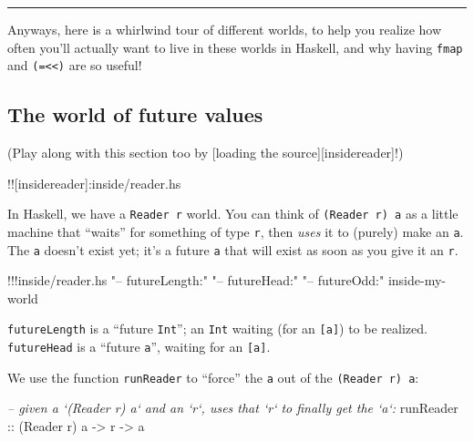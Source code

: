 \documentclass[]{article}
\newenvironment{Shaded}{}{}
\newcommand{\DataTypeTok}[1]{\textcolor[rgb]{0.56,0.13,0.00}{{#1}}}
\newcommand{\StringTok}[1]{\textcolor[rgb]{0.25,0.44,0.63}{{#1}}}
\newcommand{\CommentTok}[1]{\textcolor[rgb]{0.38,0.63,0.69}{\textit{{#1}}}}
\newcommand{\OtherTok}[1]{\textcolor[rgb]{0.00,0.44,0.13}{{#1}}}
\newcommand{\FunctionTok}[1]{\textcolor[rgb]{0.02,0.16,0.49}{{#1}}}
\newcommand{\NormalTok}[1]{{#1}}
\begin{document}
\begin{center}\rule{0.5\linewidth}{\linethickness}\end{center}

Anyways, here is a whirlwind tour of different worlds, to help you
realize how often you'll actually want to live in these worlds in
Haskell, and why having \texttt{fmap} and
\texttt{(=\textless{}\textless{})} are so useful!

\subsection{The world of future
values}\label{the-world-of-future-values}

(Play along with this section too by {[}loading the
source{]}{[}insidereader{]}!)

!!{[}insidereader{]}:inside/reader.hs

In Haskell, we have a \texttt{Reader\ r} world. You can think of
\texttt{(Reader\ r)\ a} as a little machine that ``waits'' for something
of type \texttt{r}, then \emph{uses} it to (purely) make an \texttt{a}.
The \texttt{a} doesn't exist yet; it's a future \texttt{a} that will
exist as soon as you give it an \texttt{r}.

\begin{Shaded}
\begin{Highlighting}[]
\FunctionTok{!!!}\NormalTok{inside}\FunctionTok{/}\NormalTok{reader}\FunctionTok{.}\NormalTok{hs }\StringTok{"-- futureLength:"} \StringTok{"-- futureHead:"} \StringTok{"-- futureOdd:"} \NormalTok{inside}\FunctionTok{-}\NormalTok{my}\FunctionTok{-}\NormalTok{world}
\end{Highlighting}
\end{Shaded}

\texttt{futureLength} is a ``future \texttt{Int}''; an \texttt{Int}
waiting (for an \texttt{{[}a{]}}) to be realized. \texttt{futureHead} is
a ``future \texttt{a}'', waiting for an \texttt{{[}a{]}}.

We use the function \texttt{runReader} to ``force'' the \texttt{a} out
of the \texttt{(Reader\ r)\ a}:

\begin{Shaded}
\begin{Highlighting}[]
\CommentTok{-- given a `(Reader r) a` and an `r`, uses that `r` to finally get the `a`:}
\OtherTok{runReader ::} \NormalTok{(}\DataTypeTok{Reader} \NormalTok{r) a }\OtherTok{->} \NormalTok{r }\OtherTok{->} \NormalTok{a}
\end{Highlighting}
\end{Shaded}
\end{document}
